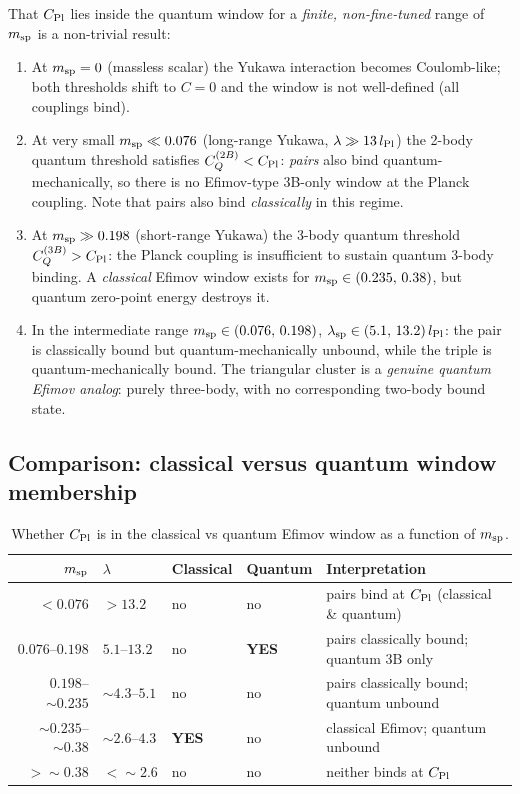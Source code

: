 That $C_{\rm Pl}$ lies inside the quantum window for a \emph{finite,
non-fine-tuned} range of $m_{\rm sp}$ is a non-trivial result:

\begin{enumerate}
\item At $m_{\rm sp}=0$ (massless scalar) the Yukawa interaction becomes
  Coulomb-like; both thresholds shift to $C=0$ and the window is not
  well-defined (all couplings bind).
\item At very small $m_{\rm sp}\ll 0.076$ (long-range Yukawa,
  $\lambda\gg13\,l_{\rm Pl}$) the 2-body quantum threshold satisfies
  $C_Q^{(2B)} < C_{\rm Pl}$: \emph{pairs} also bind quantum-mechanically,
  so there is no Efimov-type 3B-only window at the Planck coupling.
  Note that pairs also bind \emph{classically} in this regime.
\item At $m_{\rm sp}\gg 0.198$ (short-range Yukawa) the 3-body
  quantum threshold $C_Q^{(3B)} > C_{\rm Pl}$: the Planck coupling is
  insufficient to sustain quantum 3-body binding.  A \emph{classical}
  Efimov window exists for $m_{\rm sp}\in(0.235,\,0.38)$, but quantum
  zero-point energy destroys it.
\item In the intermediate range $m_{\rm sp}\in(0.076,\,0.198)$,
  $\lambda_{\rm sp}\in(5.1,\,13.2)\,l_{\rm Pl}$:
  the pair is classically bound but quantum-mechanically unbound,
  while the triple is quantum-mechanically bound.
  The triangular cluster is a \emph{genuine quantum Efimov analog}:
  purely three-body, with no corresponding two-body bound state.
\end{enumerate}

\subsection{Comparison: classical versus quantum window membership}

\begin{table}[h]
\centering
\caption{Whether $C_{\rm Pl}$ is in the classical vs quantum Efimov
window as a function of $m_{\rm sp}$.}
\label{tab:window_comparison}
\begin{tabular}{rllll}
\hline
$m_{\rm sp}$ & $\lambda$ & Classical & Quantum & Interpretation \\
\hline
$<0.076$ & $>13.2$ & no & no & pairs bind at $C_{\rm Pl}$ (classical \& quantum) \\
$0.076$--$0.198$ & $5.1$--$13.2$ & no & \textbf{YES} & pairs classically bound; quantum 3B only \\
$0.198$--$\sim0.235$ & $\sim4.3$--$5.1$ & no & no & pairs classically bound; quantum unbound \\
$\sim0.235$--$\sim0.38$ & $\sim2.6$--$4.3$ & \textbf{YES} & no & classical Efimov; quantum unbound \\
$>\sim0.38$ & $<\sim2.6$ & no & no & neither binds at $C_{\rm Pl}$ \\
\hline
\end{tabular}
\end{table}

